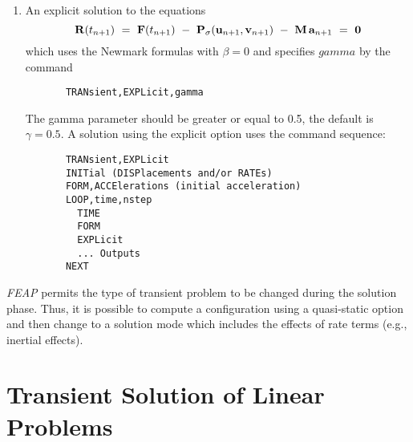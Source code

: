 \begin{enumerate}
\item
{An explicit solution to the equations
\begin{equation}
\mathbf{R} (t_{n+1}) ~=~ \mathbf{F}(t_{n+1})
~-~ \mathbf{P}_{\sigma}( \mathbf{u}_{n+1} , \mathbf{v}_{n+1} )
~-~ \mathbf{M} \, \mathbf{a}_{n+1} ~=~ {\bf 0}
\end{equation}
which uses the Newmark formulas with $\beta = 0$ and specifies $gamma$ by
the command
\begin{verbatim}
       TRANsient,EXPLicit,gamma
\end{verbatim}
The gamma parameter should
be greater or equal to 0.5, the default is $\gamma = 0.5$.
A solution using the explicit option uses the command sequence:
\begin{verbatim}
       TRANsient,EXPLicit
       INITial (DISPlacements and/or RATEs)
       FORM,ACCElerations (initial acceleration)
       LOOP,time,nstep
         TIME
         FORM
         EXPLicit
         ... Outputs
       NEXT
\end{verbatim}
}
\end{enumerate}

{\sl FEAP} permits the type of transient problem
to be changed during the solution phase.  Thus, it is possible to
compute a configuration using a quasi-static option and then change
to a solution mode which includes the effects of rate terms (e.g.,
inertial effects).

\section{Transient Solution of Linear Problems}
\label{tranlin}

